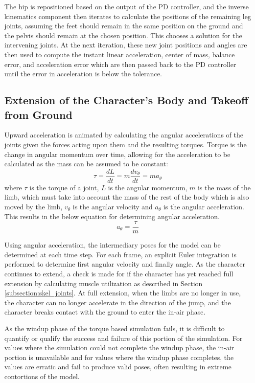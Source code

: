 The hip is repositioned based on the output of the PD controller, and the inverse kinematics component then iterates to calculate the positions of the remaining leg joints, assuming the feet should remain in the same position on the ground and the pelvis should remain at the chosen position.  This chooses a solution for the intervening joints.  At the next iteration, these new joint positions and angles are then used to compute the instant linear acceleration, center of mass, balance error, and acceleration error which are then passed back to the PD controller until the error in acceleration is below the tolerance.


\subsection{Extension of the Character's Body and Takeoff from Ground}
\label{subsection:thrust}
Upward acceleration is animated by calculating the angular accelerations of the joints given the forces acting upon them and the resulting torques.  Torque is the change in angular momentum over time, allowing for the acceleration to be calculated as the mass can be assumed to be constant: \[\tau = \dfrac{dL}{dt} = m \dfrac{dv_{\theta}}{dt} = m a_{\theta}\] where $\tau$ is the torque of a joint, $L$ is the angular momentum, $m$ is the mass of the limb, which must take into account the mass of the rest of the body which is also moved by the limb, $v_{\theta}$ is the angular velocity and $a_{\theta}$ is the angular acceleration. This results in the below equation for determining angular acceleration. \[a_{\theta} = \dfrac{\tau}{m}\]

Using angular acceleration, the intermediary poses for the model can be determined at each time step.   For each frame, an explicit Euler integration is performed to determine first angular velocity and finally angle.  As the character continues to extend, a check is made for if the character has yet reached full extension by calculating muscle utilization as described in Section \ref{subsection:skel_joints}.  At full extension, when the limbs are no longer in use, the character can no longer accelerate in the direction of the jump, and the character breaks contact with the ground to enter the in-air phase.

As the windup phase of the torque based simulation fails, it is difficult to quantify or qualify the success and failure of this portion of the simulation.  For values where the simulation could not complete the windup phase, the in-air portion is unavailable and for values where the windup phase completes, the values are erratic and fail to produce valid poses, often resulting in extreme contortions of the model.


